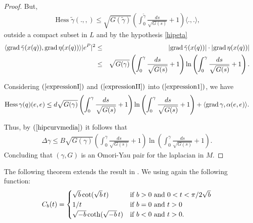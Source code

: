 \documentclass[a4paper]{amsart}
\begin{document}
\begin{proof}
But,
\begin{eqnarray}\label{expressionI}
\operatorname{Hess}\tilde{\gamma} (.,,) \leq \sqrt{G(\tilde{\gamma})}\left(\int_{0}^{\tilde{\gamma}}\frac{ds}{\sqrt{G(s)}} + 1\right)\langle .,.\rangle ,
\end{eqnarray}
outside a compact subset in $ L $ and by the hypothesis \eqref{hipeta}
\begin{eqnarray}\label{expressionII}
\langle {{{\rm{grad}\,}}} \tilde{\gamma}(x(q)),{{{\rm{grad}\,}}} \eta(x(q))\rangle\vert e^P\vert^2 &\leq & \vert {{{\rm{grad}\,}}} \tilde{\gamma}(x(q))\vert \cdot \vert {{{\rm{grad}\,}}} \eta(x(q))\vert \nonumber \\
&\leq & \sqrt{G(\gamma)}\left(\int_{0}^{\gamma}\frac{ds}{\sqrt{G(s)}} + 1\right)\ln\left(\int_{0}^{\gamma}\frac{ds}{\sqrt{G(s)}} + 1\right).
\end{eqnarray}

Considering $(\ref{expressionI})$ and $(\ref{expressionII})$ into $(\ref{expression1})$, we have
\begin{eqnarray*}
\operatorname{Hess} \gamma(q)(e,e) \leq d\sqrt{G(\gamma)}\left(\int_{0}^{\gamma}\frac{ds}{\sqrt{G(s)}} + 1\right)\ln\left(\int_{0}^{\gamma}\frac{ds}{\sqrt{G(s)}} + 1\right) + \langle {{{\rm{grad}\,}}} \gamma,\alpha(e,e)\rangle .
\end{eqnarray*}

Thus, by $(\ref{hipcurvmedia})$ it follows that
\begin{eqnarray*}
\Delta \gamma \leq B\sqrt{G(\gamma)}\left(\int_{0}^{\gamma}\frac{ds}{\sqrt{G(s)}} + 1\right)\ln\left(\int_{0}^{\gamma}\frac{ds}{\sqrt{G(s)}} + 1\right).
\end{eqnarray*}
Concluding that $(\gamma ,G)$ is an Omori-Yau pair for the laplacian in $M$.
\end{proof}

The following theorem extends the result in \cite{alias-bessa-dajczer}. We using again the following function:
\[
C_b(t)=
\begin{cases}
\sqrt{b}\cot(\sqrt{b}\,t) & \mbox{\rm if $b>0$ and $0<t<\pi/2\sqrt{b}$}\\
1/t & \mbox{\rm if $b=0$ and $t>0$}\\
\sqrt{-b}\coth(\sqrt{-b}\,t) & \mbox{\rm if $b<0$ and $t>0$}.
\end{cases}
\]
\end{document}
